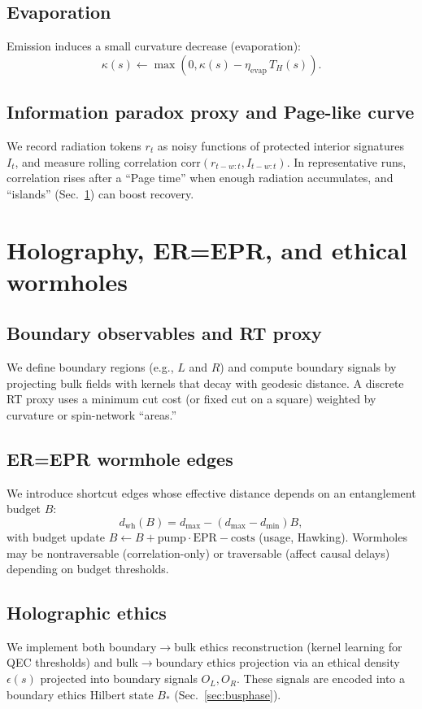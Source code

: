\documentclass[11pt]{article}
\begin{document}
\subsection{Evaporation}
Emission induces a small curvature decrease (evaporation):
\begin{equation}
\kappa(s)\leftarrow \max(0,\kappa(s)-\eta_{\mathrm{evap}}\,T_H(s)).
\end{equation}

\subsection{Information paradox proxy and Page-like curve}
We record radiation tokens $r_t$ as noisy functions of protected interior signatures $I_t$, and measure rolling correlation $\mathrm{corr}(r_{t-w:t},I_{t-w:t})$. In representative runs, correlation rises after a ``Page time'' when enough radiation accumulates, and ``islands'' (Sec.~\ref{sec:holo}) can boost recovery.

\section{Holography, ER=EPR, and ethical wormholes}
\label{sec:holo}
\subsection{Boundary observables and RT proxy}
We define boundary regions (e.g., $L$ and $R$) and compute boundary signals by projecting bulk fields with kernels that decay with geodesic distance. A discrete RT proxy uses a minimum cut cost (or fixed cut on a square) weighted by curvature or spin-network ``areas.''

\subsection{ER=EPR wormhole edges}
We introduce shortcut edges whose effective distance depends on an entanglement budget $B$:
\begin{equation}
d_{\mathrm{wh}}(B)=d_{\max}-(d_{\max}-d_{\min})B,
\end{equation}
with budget update $B\leftarrow B + \mathrm{pump}\cdot \mathrm{EPR} - \mathrm{costs}$ (usage, Hawking). Wormholes may be nontraversable (correlation-only) or traversable (affect causal delays) depending on budget thresholds.

\subsection{Holographic ethics}
We implement both boundary$\to$bulk ethics reconstruction (kernel learning for QEC thresholds) and bulk$\to$boundary ethics projection via an ethical density $\epsilon(s)$ projected into boundary signals $O_L,O_R$. These signals are encoded into a boundary ethics Hilbert state $B_{\ast}$ (Sec.~\ref{sec:busphase}).
\end{document}
